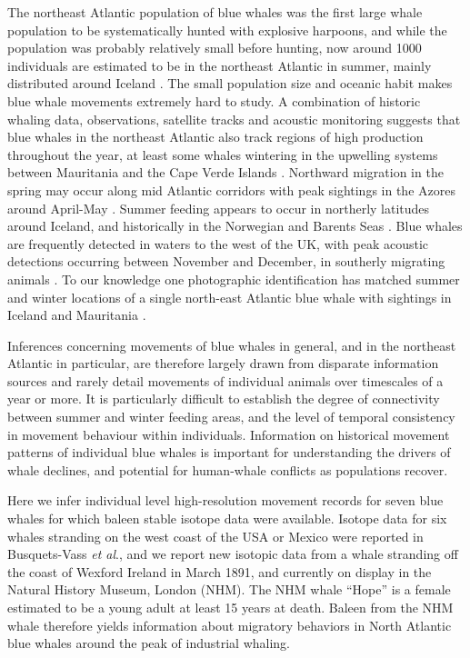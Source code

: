 \documentclass[a4paper,12pt]{article}
\begin{document}
The northeast Atlantic population of blue whales was the first large whale population to be systematically hunted with explosive harpoons, and while the population was probably relatively small before hunting, now around 1000 individuals are estimated to be in the northeast Atlantic in summer, mainly distributed around Iceland \cite{pike2009note}. 
The small population size and oceanic habit makes blue whale movements extremely hard to study. 
A combination of historic whaling data, observations, satellite tracks and acoustic monitoring suggests that blue whales in the northeast Atlantic also
track regions of high production throughout the year, at least some
whales wintering in the upwelling systems between Mauritania and the
Cape Verde Islands \cite{baines2014upwellings}. 
Northward migration in the spring may occur along mid Atlantic corridors with peak sightings in the Azores around April-May \cite{silva2013north}. 
Summer feeding appears to occur in northerly latitudes around Iceland, and historically in the Norwegian and Barents Seas \cite{pike2009note}. 
Blue whales are frequently detected in waters to the west of the UK, with peak acoustic detections occurring between November and December, in southerly migrating animals \cite{reeves2004historical,baines2017autumn,charif2009acoustic,visser2011timing}.
To our knowledge one photographic identification has matched summer and winter locations of a single north-east Atlantic blue whale with sightings in Iceland and Mauritania \cite{poster}.

Inferences concerning movements of blue whales in general, and in the northeast Atlantic in particular, are therefore largely drawn from disparate information sources and rarely detail movements of individual animals over timescales of a year or more. 
It is particularly difficult to establish the degree of connectivity between summer and winter feeding areas, and the level of temporal consistency in movement behaviour within individuals. 
Information on historical movement patterns of individual blue whales is important for understanding the drivers of whale declines, and potential for human-whale conflicts as populations recover.

Here we infer individual level high-resolution movement records for seven blue whales for which baleen stable isotope data were available.
Isotope data for six whales stranding on the west coast of the USA or Mexico were reported in Busquets-Vass \textit{et al}.\cite{busquets2017estimating}, and we report new isotopic data from a whale stranding off the coast of Wexford Ireland in March 1891, and currently on display in the Natural History Museum, London (NHM).
The NHM whale ``Hope'' is a female estimated to be a young adult at least 15 years at death. 
Baleen from the NHM whale therefore yields information about migratory behaviors in North Atlantic blue whales around the peak of industrial whaling.
\end{document}
